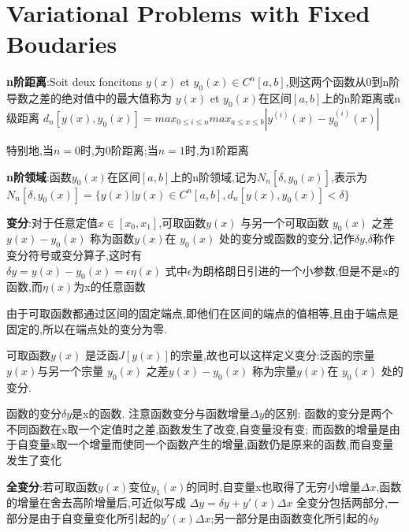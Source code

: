 \documentclass{article}
\begin{document}
\section{Variational Problems with Fixed Boudaries}
\begin{definition}
  \textbf{n阶距离}:Soit deux foncitons $y(x)$ et $y_0(x)\in C^{n}[a,b]$,则这两个函数从0到n阶导数之差的绝对值中的最大值称为 $y(x)$ et $y_0(x)$在区间$[a,b]$上的n阶距离或n级距离
  $d_n[y(x),y_0(x)]=max_{0 \leqslant i \leqslant n}max_{a \leqslant x \leqslant b}|y^{(i)}(x)-y_0^{(i)}(x)|$
\end{definition}
特别地,当$n=0$时,为0阶距离;当$n=1$时,为1阶距离

\begin{definition}
\textbf{n阶领域}:函数$y_0(x)$在区间$[a,b]$上的n阶领域,记为$N_n[\delta,y_0(x)]$,表示为\newline
$N_n[\delta,y_0(x)]=\{y(x)|y(x)\in C^{n}[a,b],d_n[y(x),y_0(x)] < \delta \}$
\end{definition}
\begin{definition}
\textbf{变分}:对于任意定值$x \in [x_0,x_1]$,可取函数$y(x)$ 与另一个可取函数 $y_0(x)$ 之差$y(x)-y_0(x)$ 称为函数$y(x)$在 $y_0(x)$ 处的变分或函数的变分,记作$\delta y$,$\delta$称作变分符号或变分算子,这时有\\
$\delta y=y(x)-y_0(x)=\epsilon\eta(x)$ \newline
式中$\epsilon$为朗格朗日引进的一个小参数,但是不是x的函数,而$\eta(x)$为x的任意函数
\end{definition}
由于可取函数都通过区间的固定端点,即他们在区间的端点的值相等,且由于端点是固定的,所以在端点处的变分为零. \newline

可取函数$y(x)$ 是泛函$J[y(x)]$的宗量,故也可以这样定义变分:泛函的宗量$y(x)$与另一个宗量 $y_0(x)$ 之差$y(x)-y_0(x)$ 称为宗量$y(x)$在 $y_0(x)$ 处的变分.

\begin{attention}
函数的变分$\delta y$是x的函数.\newline
注意函数变分与函数增量$\Delta y$的区别:\newline
函数的变分是两个不同函数在x取一个定值时之差,函数发生了改变,自变量没有变;\newline
而函数的增量是由于自变量x取一个增量而使同一个函数产生的增量,函数仍是原来的函数,而自变量发生了变化
\end{attention}

\textbf{全变分}:若可取函数$y(x)$变位$y_1(x)$的同时,自变量x也取得了无穷小增量$\Delta x$,函数的增量在舍去高阶增量后,可近似写成\newline
$\Delta y=\delta y + y'(x)\Delta x$
\newline
全变分包括两部分,一部分是由于自变量变化所引起的$y'(x)\Delta x$;另一部分是由函数变化所引起的$\delta y $
\end{document}
